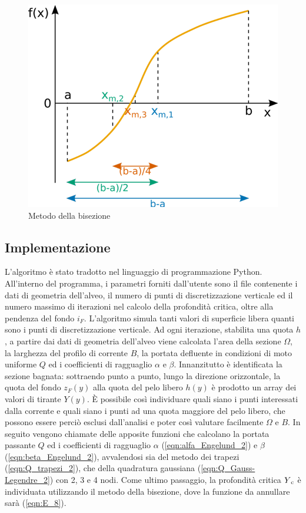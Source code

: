 \documentclass[12pt]{article} %
\begin{document}
\begin{figure} [H]
    \centering
    \includegraphics{bisezione.png}
    \caption{Metodo della bisezione}
    \label{fig:bisezione}
\end{figure}

\subsection{Implementazione}

\noindent L’algoritmo è stato tradotto nel linguaggio di programmazione Python. All’interno del programma, i parametri forniti dall’utente sono il file contenente i dati di geometria dell’alveo, il numero di punti di discretizzazione verticale ed il numero massimo di iterazioni nel calcolo della profondità critica, oltre alla pendenza del fondo $i_F$.
L'algoritmo simula tanti valori di superficie libera quanti sono i punti di discretizzazione verticale. Ad ogni iterazione, stabilita una quota $h$, a partire dai dati di geometria dell’alveo viene calcolata l’area della sezione $\Omega$, la larghezza del profilo di corrente $B$, la portata defluente in condizioni di moto uniforme $Q$ ed i coefficienti di ragguaglio $\alpha$ e $\beta$. 
Innanzitutto è identificata la sezione bagnata: sottraendo punto a punto, lungo la direzione orizzontale, la quota del fondo $z_F(y)$ alla quota del pelo libero $h(y)$ è prodotto un array dei valori di tirante $Y(y)$. È possibile così individuare quali siano i punti interessati dalla corrente e quali siano i punti ad una quota maggiore del pelo libero, che possono essere perciò esclusi dall’analisi e poter così valutare facilmente $\Omega$ e $B$. In seguito vengono chiamate delle apposite funzioni che calcolano la portata passante $Q$ ed i coefficienti di ragguaglio $\alpha$ (\ref{eqn:alfa_Engelund_2}) e $\beta$ (\ref{eqn:beta_Engelund_2}), avvalendosi sia del metodo dei trapezi (\ref{eqn:Q_trapezi_2}), che della quadratura gaussiana (\ref{eqn:Q_Gauss-Legendre_2}) con 2, 3 e 4 nodi. 
Come ultimo passaggio, la profondità critica $Y\textsubscript{c}$ è individuata utilizzando il metodo della bisezione, dove la funzione da annullare sarà (\ref{eqn:E_8}).
\end{document}
